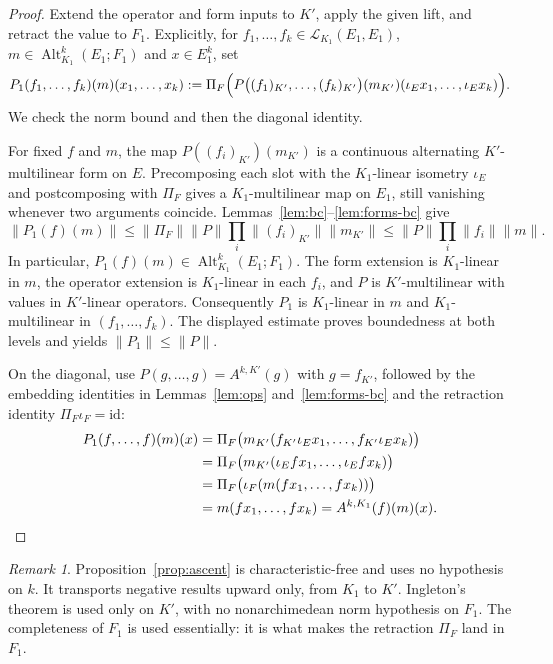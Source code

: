 \documentclass[11pt]{amsart}
\theoremstyle{definition}
\theoremstyle{remark}
\newtheorem{remark}[theorem]{Remark}
\numberwithin{equation}{section}
\newcommand{\cL}{\mathcal L}
\newcommand{\Alt}{\operatorname{Alt}}
\newcommand{\id}{\mathrm{id}}
\newcommand{\norm}[1]{\lVert #1\rVert}
\theoremstyle{plain}
\theoremstyle{definition}
\theoremstyle{plain}
\begin{document}
\begin{proof}
Extend the operator and form inputs to $K'$, apply the given lift, and retract the value to $F_1$. Explicitly,
for $f_1,\dots,f_k\in\cL_{K_1}(E_1,E_1)$, $m\in\Alt^k_{K_1}(E_1;F_1)$ and $x\in E_1^k$, set
\[
P_1(f_1,\dots,f_k)(m)(x_1,\dots,x_k):=
\Pi_F\Bigl(P\bigl((f_1)_{K'},\dots,(f_k)_{K'}\bigr)(m_{K'})(\iota_Ex_1,\dots,\iota_Ex_k)\Bigr).
\]
We check the norm bound and then the diagonal identity.

For fixed $f$ and $m$, the map $P((f_i)_{K'})(m_{K'})$ is a continuous alternating $K'$\nobreakdash-multilinear form
on $E$. Precomposing each slot with the $K_1$\nobreakdash-linear isometry $\iota_E$ and postcomposing with
$\Pi_F$ gives a $K_1$\nobreakdash-multilinear map on $E_1$, still vanishing whenever two arguments coincide.
Lemmas~\ref{lem:bc}--\ref{lem:forms-bc} give
\[
\norm{P_1(f)(m)}
\le\norm{\Pi_F}\norm P\prod_i\norm{(f_i)_{K'}}\norm{m_{K'}}
\le\norm P\prod_i\norm{f_i}\norm m.
\]
In particular, $P_1(f)(m)\in\Alt^k_{K_1}(E_1;F_1)$.
The form extension is $K_1$\nobreakdash-linear in $m$, the operator extension is $K_1$\nobreakdash-linear in each
$f_i$, and $P$ is $K'$\nobreakdash-multilinear with values in $K'$\nobreakdash-linear operators.
Consequently $P_1$ is $K_1$\nobreakdash-linear in $m$ and $K_1$\nobreakdash-multilinear in $(f_1,\dots,f_k)$.
The displayed estimate proves boundedness at both levels and yields $\norm{P_1}\le\norm P$.

On the diagonal, use $P(g,\dots,g)=A^{k,K'}(g)$ with $g=f_{K'}$, followed by the embedding identities in
Lemmas~\ref{lem:ops} and~\ref{lem:forms-bc} and the retraction identity $\Pi_F\iota_F=\id$:
\begin{align*}
P_1(f,\dots,f)(m)(x)
&=\Pi_F\bigl(m_{K'}(f_{K'}\iota_Ex_1,\dots,f_{K'}\iota_Ex_k)\bigr)\\
&=\Pi_F\bigl(m_{K'}(\iota_Efx_1,\dots,\iota_Efx_k)\bigr)\\
&=\Pi_F\bigl(\iota_F(m(fx_1,\dots,fx_k))\bigr)\\
&=m(fx_1,\dots,fx_k)=A^{k,K_1}(f)(m)(x).\qedhere
\end{align*}
\end{proof}

\begin{remark}\label{rem:ascent}
Proposition~\ref{prop:ascent} is characteristic-free and uses no hypothesis on $k$. It transports negative results
upward only, from $K_1$ to $K'$. Ingleton's theorem is used only on $K'$, with no nonarchimedean norm hypothesis on $F_1$. The completeness of $F_1$ is used essentially: it is what makes the retraction $\Pi_F$ land in $F_1$.
\end{remark}
\end{document}

